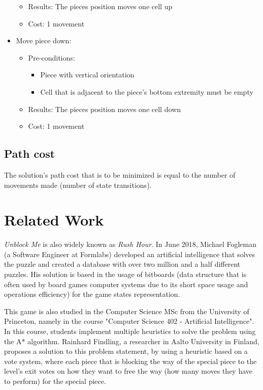 \documentclass[conference]{IEEEtran}
\begin{document}
\begin{itemize}
\begin{itemize}
\begin{itemize}
        \end{itemize}
        \item Results: The pieces position moves one cell up
        \item Cost: 1 movement
    \end{itemize}
    \item Move piece down:
    \begin{itemize}
        \item Pre-conditions:
        \begin{itemize}
            \item Piece with vertical orientation
            \item Cell that is adjacent to the piece's bottom extremity must be empty
        \end{itemize}
        \item Results: The pieces position moves one cell down
        \item Cost: 1 movement
    \end{itemize}
\end{itemize}

\subsection{Path cost}
The solution's path cost that is to be minimized is equal to the number of movements made (number of state transitions).


\section{Related Work}
\textit{Unblock Me} is also widely known as \textit{Rush Hour}. In June 2018, Michael Fogleman (a Software Engineer at Formlabs) developed an artificial intelligence that solves the puzzle and created a database with over two million and a half different puzzles\cite{b2}. His solution is based in the usage of bitboards\cite{b3} (data structure that is often used by board games computer systems due to its short space usage and operations efficiency) for the game states representation. 

This game is also studied in the Computer Science MSc from the University of Princeton, namely in the course "Computer Science 402 - Artificial Intelligence". In this course, students implement multiple heuristics to solve the problem using the A* algorithm\cite{b4}. Rainhard Findling, a researcher in Aalto University in Finland, proposes a solution to this problem statement, by using a heuristic based on a vote system, where each piece that is blocking the way of the special piece to the level's exit votes on how they want to free the way (how many moves they have to perform) for the special piece\cite{b5}. 
\end{document}
